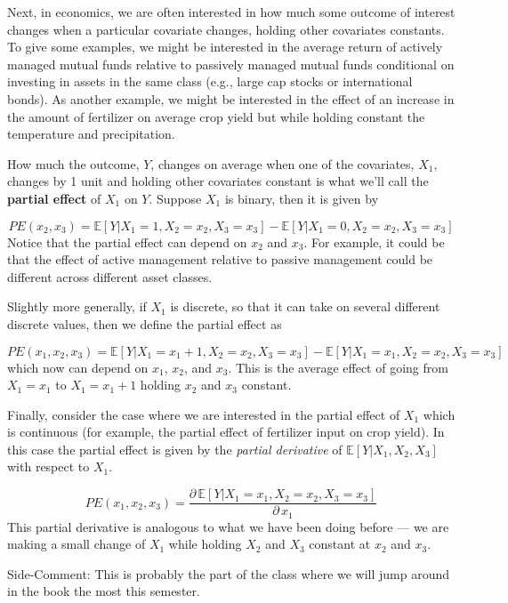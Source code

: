 \documentclass[
  letterpaper,
  DIV=11,
  numbers=noendperiod]{scrreprt}
\begin{document}
Next, in economics, we are often interested in how much some outcome of
interest changes when a particular covariate changes, holding other
covariates constants. To give some examples, we might be interested in
the average return of actively managed mutual funds relative to
passively managed mutual funds conditional on investing in assets in the
same class (e.g., large cap stocks or international bonds). As another
example, we might be interested in the effect of an increase in the
amount of fertilizer on average crop yield but while holding constant
the temperature and precipitation.

How much the outcome, \(Y\), changes on average when one of the
covariates, \(X_1\), changes by 1 unit and holding other covariates
constant is what we'll call the \textbf{partial effect} of \(X_1\) on
\(Y\). Suppose \(X_1\) is binary, then it is given by

\[
  PE(x_2,x_3) = \mathbb{E}[Y | X_1=1, X_2=x_2, X_3=x_3] - \mathbb{E}[Y | X_1=0,X_2=x_2,X_3=x_3]
\] Notice that the partial effect can depend on \(x_2\) and \(x_3\). For
example, it could be that the effect of active management relative to
passive management could be different across different asset classes.

Slightly more generally, if \(X_1\) is discrete, so that it can take on
several different discrete values, then we define the partial effect as

\[
  PE(x_1,x_2,x_3) = \mathbb{E}[Y | X_1=x_1+1, X_2=x_2, X_3=x_3] - \mathbb{E}[Y | X_1=x_1,X_2=x_2,X_3=x_3]
\] which now can depend on \(x_1\), \(x_2\), and \(x_3\). This is the
average effect of going from \(X_1=x_1\) to \(X_1=x_1+1\) holding
\(x_2\) and \(x_3\) constant.

Finally, consider the case where we are interested in the partial effect
of \(X_1\) which is continuous (for example, the partial effect of
fertilizer input on crop yield). In this case the partial effect is
given by the \emph{partial derivative} of \(\mathbb{E}[Y|X_1,X_2,X_3]\)
with respect to \(X_1\).

\[
  PE(x_1,x_2,x_3) = \frac{\partial \, \mathbb{E}[Y|X_1=x_1, X_2=x_2, X_3=x_3]}{\partial \, x_1}
\] This partial derivative is analogous to what we have been doing
before --- we are making a small change of \(X_1\) while holding \(X_2\)
and \(X_3\) constant at \(x_2\) and \(x_3\).

{Side-Comment:} This is probably the part of the class where we will
jump around in the book the most this semester.
\end{document}
